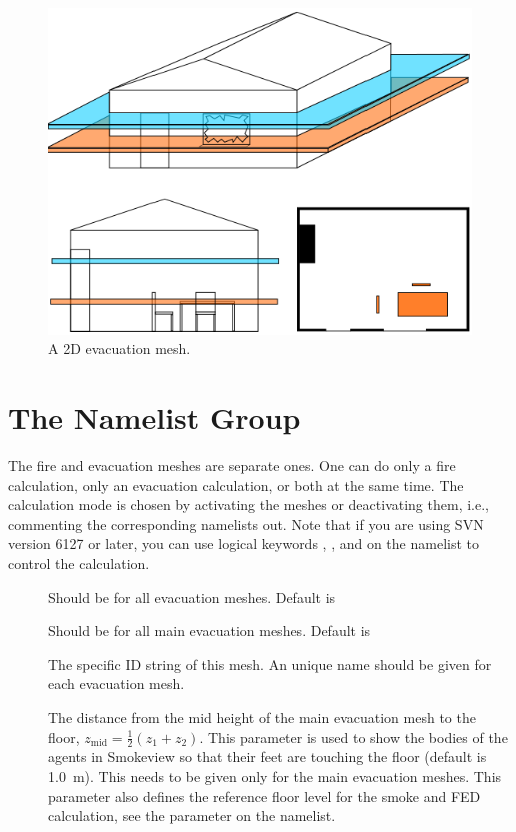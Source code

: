 \documentclass[12pt,a4paper,final,twoside]{stylevk}
\begin{document}
%
\begin{figure}[!tb]
  \centerline{\includegraphics[clip=true,
    width=120mm]{FIGURES/evac_grid2}}
  \caption{A 2D evacuation mesh.}\label{Fig_EvacGrid} 
\end{figure}
%


\section{The  Namelist Group}\label{Sec_EvacGrid}

\noindent The fire and evacuation meshes are separate ones.  One can
do only a fire calculation, only an evacuation calculation, or both at
the same time.  The calculation mode is chosen by activating the
meshes or deactivating them, i.e., commenting the corresponding
 namelists out.  Note that if you are using SVN version
6127 or later, you can use logical keywords ,
, and  on the
 namelist to control the calculation.

\begin{description}
%
\item[] Should be  for all evacuation
  meshes.  Default is 
%
\item[] Should be  for all main
  evacuation meshes.  Default is 
%
\item[] The specific ID string of this mesh.  An unique name
  should be given for each evacuation mesh.
%
\item[] The distance from the mid height of the
  main evacuation mesh to the floor, $z_\mathrm{mid} = \frac{1}{2}
  (z_1+z_2)$.  This parameter is used to show the bodies of the agents
  in Smokeview so that their feet are touching the floor (default is
  1.0~m).  This needs to be given only for the main evacuation meshes.
  This parameter also defines the reference floor level for the smoke
  and FED calculation, see the parameter 
  on the  namelist.
%
\end{description}
\end{document}
